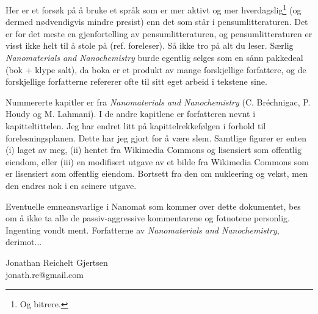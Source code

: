 \noindent Her er et forsøk på å bruke et språk som er mer aktivt og mer hverdagslig\footnote{Og bitrere.} (og dermed nødvendigvis mindre presist) enn det som står i pensumlitteraturen. Det er for det meste en gjenfortelling av pensumlitteraturen, og pensumlitteraturen er visst ikke helt til å stole på (ref. foreleser). Så ikke tro på alt du leser. Særlig \emph{Nanomaterials and Nanochemistry} burde egentlig selges som en sånn pakkedeal (bok + klype salt), da boka er et produkt av mange forskjellige forfattere, og de forskjellige forfatterne refererer ofte til sitt eget arbeid i tekstene sine.

Nummererte kapitler er fra \emph{Nanomaterials and Nanochemistry} (C. Bréchnigac, P. Houdy og M. Lahmani). I de andre kapitlene er forfatteren nevnt i kapitteltittelen. Jeg har endret litt på kapittelrekkefølgen i forhold til forelesningsplanen. Dette har jeg gjort for å være slem. Samtlige figurer er enten (i) laget av meg, (ii) hentet fra Wikimedia Commons og lisensiert som offentlig eiendom, eller (iii) en modifisert utgave av et bilde fra Wikimedia Commons som er lisensiert som offentlig eiendom. Bortsett fra den om nukleering og vekst, men den endres nok i en seinere utgave.

Eventuelle emneansvarlige i Nanomat som kommer over dette dokumentet, bes om å ikke ta alle de passiv-aggressive kommentarene og fotnotene personlig. Ingenting vondt ment. Forfatterne av \emph{Nanomaterials and Nanochemistry}, derimot...

\begin{flushright}Jonathan Reichelt Gjertsen \\ {\ttfamily jonath.re@gmail.com}\end{flushright}